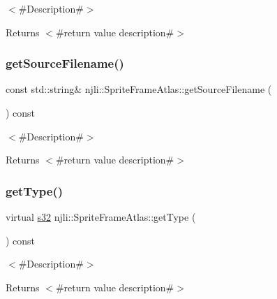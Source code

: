 $<$\#\+Description\#$>$

\begin{DoxyReturn}{Returns}
$<$\#return value description\#$>$ 
\end{DoxyReturn}
\mbox{\label{classnjli_1_1_sprite_frame_atlas_a5cc4b4e987a852f650fc1b85df38309e}} 
\subsubsection{\texorpdfstring{get\+Source\+Filename()}{getSourceFilename()}}
{\footnotesize\ttfamily const std\+::string\& njli\+::\+Sprite\+Frame\+Atlas\+::get\+Source\+Filename (\begin{DoxyParamCaption}{ }\end{DoxyParamCaption}) const}

$<$\#\+Description\#$>$

\begin{DoxyReturn}{Returns}
$<$\#return value description\#$>$ 
\end{DoxyReturn}
\mbox{\label{classnjli_1_1_sprite_frame_atlas_a65d153f3e642f3fc07c8cd428bcedf19}} 
\subsubsection{\texorpdfstring{get\+Type()}{getType()}}
{\footnotesize\ttfamily virtual \mbox{\hyperlink{_util_8h_aa62c75d314a0d1f37f79c4b73b2292e2}{s32}} njli\+::\+Sprite\+Frame\+Atlas\+::get\+Type (\begin{DoxyParamCaption}{ }\end{DoxyParamCaption}) const\hspace{0.3cm}{\ttfamily [virtual]}}

$<$\#\+Description\#$>$

\begin{DoxyReturn}{Returns}
$<$\#return value description\#$>$ 
\end{DoxyReturn}


